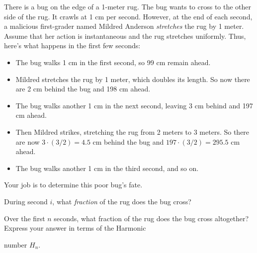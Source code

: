 \documentclass[12pt,twoside]{article}
\begin{document}

\begin{problem}
There is a bug on the edge of a 1-meter rug.  The bug wants to cross
to the other side of the rug.  It crawls at 1 cm per second.  However,
at the end of each second, a malicious first-grader named Mildred
Anderson \textit{stretches} the rug by 1 meter.  Assume that her
action is instantaneous and the rug stretches uniformly.  Thus, here's
what happens in the first few seconds:

\begin{itemize}

\item The bug walks 1 cm in the first second, so 99 cm remain ahead.

\item Mildred stretches the rug by 1 meter, which doubles its length.
So now there are 2 cm behind the bug and 198 cm ahead.

\item The bug walks another 1 cm in the next second, leaving 3 cm
behind and 197 cm ahead.

\item Then Mildred strikes, stretching the rug from 2 meters to 3
meters.  So there are now $3 \cdot (3 / 2) = 4.5$ cm behind the bug
and $197 \cdot (3/2) = 295.5$ cm ahead.

\item The bug walks another 1 cm in the third second, and so on.

\end{itemize}

Your job is to determine this poor bug's fate.

\bparts

\item During second $i$, what \textit{fraction} of the rug does the
bug cross?


\item Over the first $n$ seconds, what fraction of the rug does the
bug cross altogether?  Express your answer in terms of the Harmonic

number $H_n$.



\end{problem}
\end{document}
